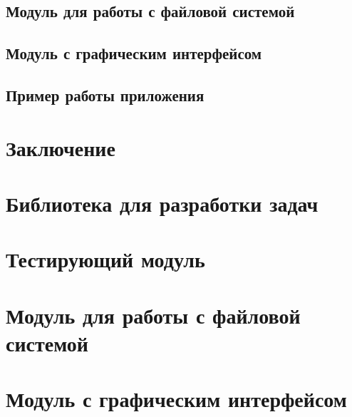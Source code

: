 \section{Модуль для работы с файловой системой}

\section{Модуль с графическим интерфейсом}

\section{Пример работы приложения}


\chapter*{Заключение}




\newpage
\appendix
{}
\footnotesize
\chapter{Библиотека для разработки задач}

\chapter{Тестирующий модуль}

\chapter{Модуль для работы с файловой системой}

\chapter{Модуль с графическим интерфейсом}


